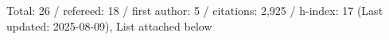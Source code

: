 Total: 26 / refereed: 18 / first author: 5 / citations: 2,925 / h-index: 17 (Last updated: 2025-08-09), List attached below